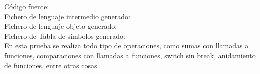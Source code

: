 \documentclass{article}[a4paper]
\begin{document}
\begin{appendices}
Código fuente:
\\
\hspace{\parindent} Fichero de lenguaje intermedio generado:
\\
\hspace{\parindent} Fichero de lenguaje objeto generado:
\\
\hspace{\parindent} Fichero de Tabla de simbolos generado:
\\

En esta prueba se realiza todo tipo de operaciones, como sumas con llamadas a funciones, comparaciones con llamadas a funciones, switch sin break, anidamiento de funciones, entre otras cosas.

\end{appendices}
\end{document}
